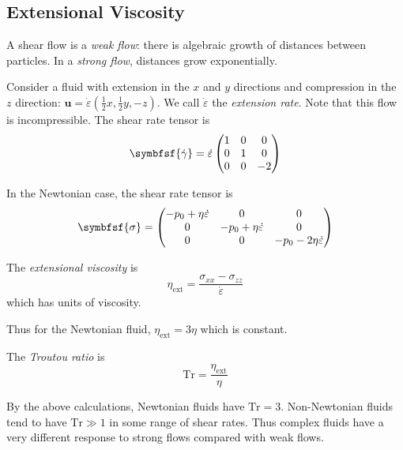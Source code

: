 \documentclass{jknotes}
\begin{document}
\subsection{Extensional Viscosity}
A shear flow is a \emph{weak flow}: there is algebraic growth of distances
between particles. In a \emph{strong flow}, distances grow exponentially.

Consider a fluid with extension in the $x$ and $y$ directions and compression
in the $z$ direction: $\symbf{u} =
\dot{\varepsilon}\left(\frac{1}{2}x,\frac{1}{2}y, -z\right)$. We call
$\dot{\varepsilon}$ the \emph{extension rate}. Note that this flow is
incompressible. The shear rate tensor is
\begin{equation}
	\symbfsf{\srate} = \dot{\varepsilon}\begin{pmatrix} 1 & 0 & 0 \\ 0 &
	1 & 0 \\ 0 & 0 & -2 \end{pmatrix}
\end{equation}

In the Newtonian case, the shear rate tensor is
\begin{equation}
	\symbfsf{\sigma} = \begin{pmatrix}
		-p_0 + \eta \dot{\varepsilon} & 0  & 0 \\
		0 & -p_0 + \eta \dot{\varepsilon} & 0 \\
		0 & 0 & -p_0 -2 \eta \dot{\varepsilon} 
	\end{pmatrix}
\end{equation}

\begin{defn}
	The \emph{extensional viscosity} is
	\begin{equation}
		\eta_{\text{ext}} = \frac{\sigma_{xx}-\sigma_{zz}}{\dot{\varepsilon}}
	\end{equation}
	which has units of viscosity.
\end{defn}

Thus for the Newtonian fluid, $\eta_{\text{ext}} = 3\eta$ which is constant. 
\begin{defn}
	The \emph{Troutou ratio} is 
	\begin{equation}
		\text{Tr} = \frac{\eta_{\text{ext}}}{\eta}
	\end{equation}
\end{defn}

By the above calculations, Newtonian fluids have $\text{Tr} = 3$.
Non-Newtonian fluids tend to have $\text{Tr} \gg 1$ in some range of shear
rates. Thus complex fluids have a very different response to strong flows
compared with weak flows.
\end{document}
